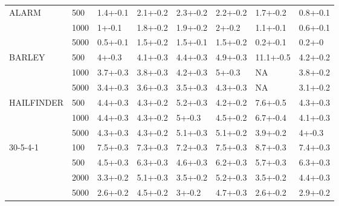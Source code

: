 \begin{table}[]
\begin{tabular}{llllllll}
ALARM      & 500     & 1.4+-0.1      & 2.1+-0.2     & 2.3+-0.2  & 2.2+-0.2 & 1.7+-0.2 & \cellcolor{lightgray}0.8+-0.1 \\
           & 1000    & 1+-0.1        & 1.8+-0.2     & 1.9+-0.2  & 2+-0.2   & 1.1+-0.1 & \cellcolor{lightgray}0.6+-0.1 \\
           & 5000    & 0.5+-0.1      & 1.5+-0.2     & 1.5+-0.1  & 1.5+-0.2 & \cellcolor{lightgray}0.2+-0.1 & \cellcolor{lightgray}0.2+-0   \\ \hline
BARLEY     & 500     & \cellcolor{lightgray}4+-0.3        & \cellcolor{lightgray}4.1+-0.3     & \cellcolor{lightgray}4.4+-0.3  & 4.9+-0.3 & 11.1+-0.5 & \cellcolor{lightgray}4.2+-0.2 \\
           & 1000    & \cellcolor{lightgray}3.7+-0.3      & \cellcolor{lightgray}3.8+-0.3     & \cellcolor{lightgray}4.2+-0.3  & 5+-0.3 & NA & \cellcolor{lightgray}3.8+-0.2 \\
           & 5000    & \cellcolor{lightgray}3.4+-0.3      & \cellcolor{lightgray}3.6+-0.3     & \cellcolor{lightgray}3.5+-0.3  & 4.3+-0.3 & NA & \cellcolor{lightgray}3.1+-0.2 \\ \hline
HAILFINDER & 500     & \cellcolor{lightgray}4.4+-0.3      & \cellcolor{lightgray}4.3+-0.2      & 5.2+-0.3  & \cellcolor{lightgray}4.2+-0.2 & 7.6+-0.5 & \cellcolor{lightgray}4.3+-0.3 \\
           & 1000    & \cellcolor{lightgray}4.4+-0.3      & \cellcolor{lightgray}4.3+-0.2     & 5+-0.3    & \cellcolor{lightgray}4.5+-0.2 & 6.7+-0.4 & \cellcolor{lightgray}4.1+-0.3 \\
           & 5000    & \cellcolor{lightgray}4.3+-0.3      & \cellcolor{lightgray}4.3+-0.2       & 5.1+-0.3  & 5.1+-0.2 & \cellcolor{lightgray}3.9+-0.2 & \cellcolor{lightgray}4+-0.3  \\ \hline
30-5-4-1   & 100     & \cellcolor{lightgray}7.5+-0.3      & \cellcolor{lightgray}7.3+-0.3     & \cellcolor{lightgray}7.2+-0.3  & \cellcolor{lightgray}7.5+-0.3 & 8.7+-0.3 & \cellcolor{lightgray}7.4+-0.3 \\
		   & 500     & \cellcolor{lightgray}4.5+-0.3      & 6.3+-0.3     & \cellcolor{lightgray}4.6+-0.3  & 6.2+-0.3 & 5.7+-0.3 & 6.3+-0.3 \\
           & 2000    & \cellcolor{lightgray}3.3+-0.2      & 5.1+-0.3     & \cellcolor{lightgray}3.5+-0.2  & 5.2+-0.3 & \cellcolor{lightgray}3.5+-0.2 & 4.4+-0.3 \\
           & 5000    & \cellcolor{lightgray}2.6+-0.2      & 4.5+-0.2     & \cellcolor{lightgray}3+-0.2    & 4.7+-0.3 & \cellcolor{lightgray}2.6+-0.2 & \cellcolor{lightgray}2.9+-0.2 \\ \hline

\end{tabular}
\end{table}
